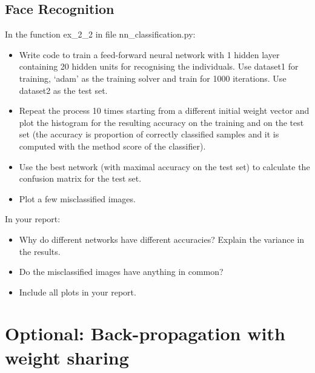 \documentclass[a4paper]{article}
\begin{document}
\subsection{Face Recognition}
In the function ex\_2\_2 in file nn\_classification.py:
\begin{itemize}
    \item Write code to train a feed-forward neural network with 1 hidden layer containing 20 hidden units for recognising the individuals. Use dataset1 for training, ‘adam’ as the training solver and train for 1000 iterations. Use dataset2 as the test set.
    \item Repeat the process 10 times starting from a different initial weight vector and plot the histogram for the resulting accuracy on the training and on the test set (the accuracy is proportion of correctly classified samples and it is computed with the method score of the classifier).
    \item Use the best network (with maximal accuracy on the test set) to calculate the confusion matrix for the test set.
	\item Plot a few misclassified images.
\end{itemize}
In your report:
\begin{itemize}
    \item Why do different networks have different accuracies? Explain the variance in the results.
    \item Do the misclassified images have anything in common?
    \item Include all plots in your report.
\end{itemize}

\section{Optional: Back-propagation with weight sharing}
\end{document}
